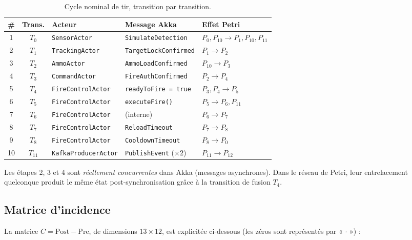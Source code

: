 \documentclass[11pt,a4paper]{article}
\newcommand{\code}[1]{\texttt{#1}}
\begin{document}
\begin{table}[H]
\centering\small
\begin{tabular}{c c l l l}
\toprule
\rowcolor{tableheader}\textbf{\#} & \textbf{Trans.} & \textbf{Acteur} & \textbf{Message Akka} & \textbf{Effet Petri} \\
\midrule
1  & $T_0$    & \code{SensorActor}        & \code{SimulateDetection}      & $P_0,P_{10} \to P_1,P_{10},P_{11}$ \\
2  & $T_1$    & \code{TrackingActor}      & \code{TargetLockConfirmed}    & $P_1 \to P_2$ \\
3  & $T_2$    & \code{AmmoActor}          & \code{AmmoLoadConfirmed}      & $P_{10} \to P_3$ \\
4  & $T_3$    & \code{CommandActor}       & \code{FireAuthConfirmed}      & $P_2 \to P_4$ \\
5  & $T_4$    & \code{FireControlActor}   & \code{readyToFire = true}     & $P_3,P_4 \to P_5$ \\
6  & $T_5$    & \code{FireControlActor}   & \code{executeFire()}          & $P_5 \to P_6,P_{11}$ \\
7  & $T_6$    & \code{FireControlActor}   & (interne)                     & $P_6 \to P_7$ \\
8  & $T_7$    & \code{FireControlActor}   & \code{ReloadTimeout}          & $P_7 \to P_8$ \\
9  & $T_8$    & \code{FireControlActor}   & \code{CooldownTimeout}        & $P_8 \to P_0$ \\
10 & $T_{11}$ & \code{KafkaProducerActor} & \code{PublishEvent} ($\times2$)& $P_{11} \to P_{12}$ \\
\bottomrule
\end{tabular}
\caption{Cycle nominal de tir, transition par transition.}
\end{table}

Les étapes 2, 3 et 4 sont \emph{réellement concurrentes} dans Akka (messages
asynchrones). Dans le réseau de Petri, leur entrelacement quelconque produit
le même état post-synchronisation grâce à la transition de fusion $T_4$.

\subsection{Matrice d'incidence}

La matrice $C = \mathrm{Post} - \mathrm{Pre}$, de dimensions $13 \times 12$,
est explicitée ci-dessous (les zéros sont représentés par « $\cdot$ ») :
\end{document}
